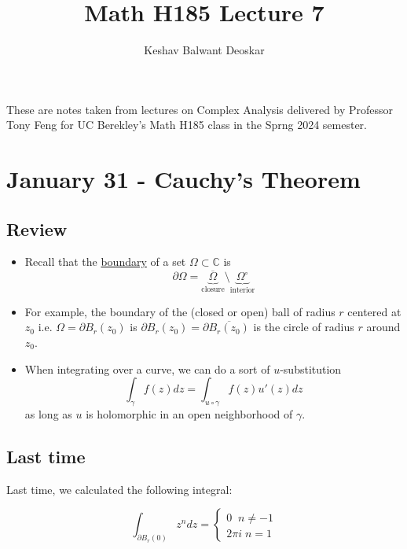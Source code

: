 \documentclass{article}
\title{Math H185 Lecture 7}
\author{Keshav Balwant Deoskar}
\newcommand{\C}{\mathbb{C}}
\begin{document}
\maketitle

These are notes taken from lectures on Complex Analysis delivered by Professor Tony Feng for UC Berekley's Math H185 class in the Sprng 2024 semester.

\tableofcontents

\pagebreak

\section{January 31 - Cauchy's Theorem}

\vskip 0.5cm
\subsection*{Review}

\vskip 0.5cm
\begin{itemize}
  \item Recall that the \underline{boundary} of a set $\Omega \subset \C$ is
  \[ \partial \Omega = \underbrace{\overline{\Omega}}_{\text{closure}} \setminus \underbrace{\Omega^{\circ}}_{\text{interior}} \]

  \item For example, the boundary of the (closed or open) ball of radius $r$ centered at $z_0$ i.e. $\Omega = \partial B_r(z_0)$ is $\partial B_r(z_0) = \partial \overline{B_r(z_0)}$ is the circle of radius $r$ around $z_0$.
  
  \item When integrating over a curve, we can do a sort of $u$-substitution 
  \[ \int_{\gamma} f(z) dz = \int_{u \circ \gamma} f(z) u'(z) dz \] as long as $u$ is holomorphic in an open neighborhood of $\gamma$.
\end{itemize}

\vskip 1cm
\subsection{Last time}
Last time, we calculated the following integral:

\begin{mathdefinitionbox}{}
  \[ \int_{\partial B_r(0)} z^n dz = \begin{cases}
    0\;\;n \neq -1 \\
    2\pi i \; n = 1
  \end{cases}  \]
\end{mathdefinitionbox}
\end{document}
